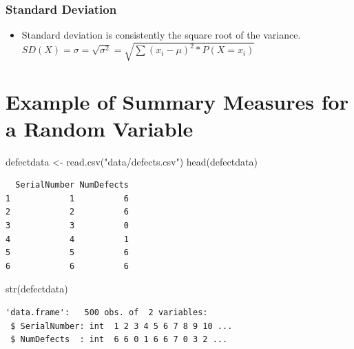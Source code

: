 \documentclass[
  letterpaper,
  DIV=11,
  numbers=noendperiod]{scrreprt}
\newenvironment{Shaded}{\begin{snugshade}}{\end{snugshade}}
\newcommand{\CommentTok}[1]{\textcolor[rgb]{0.37,0.37,0.37}{#1}}
\newcommand{\DecValTok}[1]{\textcolor[rgb]{0.68,0.00,0.00}{#1}}
\newcommand{\FunctionTok}[1]{\textcolor[rgb]{0.28,0.35,0.67}{#1}}
\newcommand{\NormalTok}[1]{\textcolor[rgb]{0.00,0.23,0.31}{#1}}
\newcommand{\OtherTok}[1]{\textcolor[rgb]{0.00,0.23,0.31}{#1}}
\newcommand{\SpecialCharTok}[1]{\textcolor[rgb]{0.37,0.37,0.37}{#1}}
\newcommand{\StringTok}[1]{\textcolor[rgb]{0.13,0.47,0.30}{#1}}
\providecommand{\tightlist}{%
  \setlength{\itemsep}{0pt}\setlength{\parskip}{0pt}}\usepackage{longtable,booktabs,array}
\begin{document}
\subsection{Standard Deviation}\label{standard-deviation}

\begin{itemize}
\tightlist
\item
  Standard deviation is consistently the square root of the variance.
  \(SD(X) = \sigma = \sqrt{\sigma^2} = \sqrt{\sum{(x_i-\mu)^2*P(X=x_i)}}\)
\end{itemize}


\chapter{Example of Summary Measures for a Random
Variable}\label{example-of-summary-measures-for-a-random-variable}

\begin{Shaded}
\begin{Highlighting}[]
\NormalTok{defectdata }\OtherTok{\textless{}{-}} \FunctionTok{read.csv}\NormalTok{(}\StringTok{"data/defects.csv"}\NormalTok{)}
\FunctionTok{head}\NormalTok{(defectdata)}
\end{Highlighting}
\end{Shaded}

\begin{verbatim}
  SerialNumber NumDefects
1            1          6
2            2          6
3            3          0
4            4          1
5            5          6
6            6          6
\end{verbatim}

\begin{Shaded}
\begin{Highlighting}[]
\FunctionTok{str}\NormalTok{(defectdata)}
\end{Highlighting}
\end{Shaded}

\begin{verbatim}
'data.frame':   500 obs. of  2 variables:
 $ SerialNumber: int  1 2 3 4 5 6 7 8 9 10 ...
 $ NumDefects  : int  6 6 0 1 6 6 7 0 3 2 ...
\end{verbatim}

\begin{Shaded}
\end{Shaded}
\end{document}
